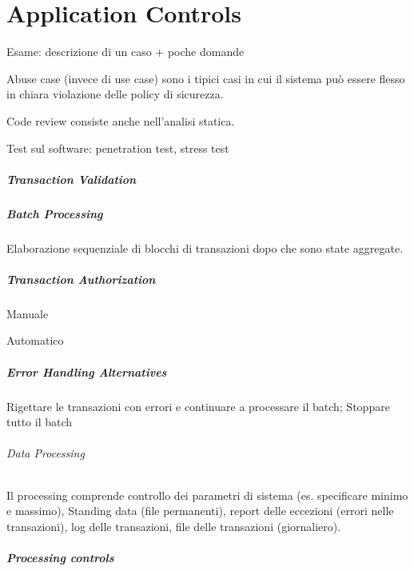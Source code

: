 \chapter{Application Controls}

Esame: descrizione di un caso + poche domande

Abuse case (invece di use case) sono i tipici casi in cui il sistema può essere
flesso in chiara violazione delle policy di sicurezza.

Code review consiste anche nell'analisi statica.

Test sul software: penetration test, stress test

\paragraph{Transaction Validation}

\paragraph{Batch Processing} Elaborazione sequenziale di blocchi di transazioni
dopo che sono state aggregate. 

\paragraph{Transaction Authorization}
Manuale

Automatico

\paragraph{Error Handling Alternatives}
Rigettare le transazioni con errori e continuare a processare il batch;
Stoppare tutto il batch



\subparagraph{Data Processing}


Il processing comprende controllo dei parametri di sistema (es. specificare
minimo e massimo), Standing data (file permanenti), report delle eccezioni
(errori nelle transazioni), log delle transazioni, file delle transazioni
(giornaliero).

\paragraph{Processing controls}

